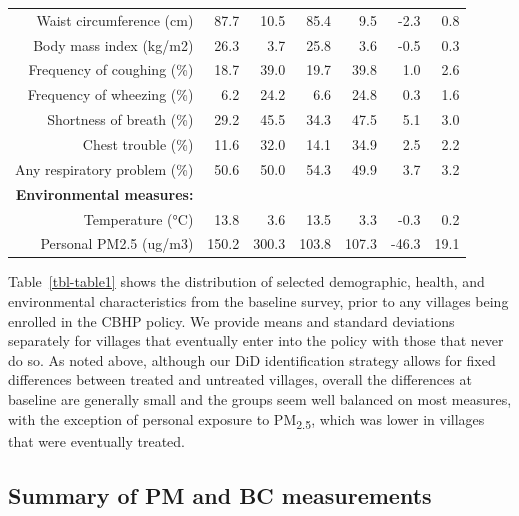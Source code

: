 \documentclass[
  letterpaper,
  DIV=11,
  numbers=noendperiod]{scrartcl}
\makeatletter
\renewenvironment{table}%
   {\renewcommand\familydefault\sfdefault
    \@float{table}}
   {\end@float}
\makeatother
\begin{document}
\begin{table}
\begin{tabular}[t]{rrrrrrr}
Waist circumference (cm) & 87.7 & 10.5 & 85.4 & 9.5 & -2.3 & 0.8\\
Body mass index (kg/m2) & 26.3 & 3.7 & 25.8 & 3.6 & -0.5 & 0.3\\
Frequency of coughing (\%) & 18.7 & 39.0 & 19.7 & 39.8 & 1.0 & 2.6\\
Frequency of wheezing (\%) & 6.2 & 24.2 & 6.6 & 24.8 & 0.3 & 1.6\\
Shortness of breath (\%) & 29.2 & 45.5 & 34.3 & 47.5 & 5.1 & 3.0\\
Chest trouble (\%) & 11.6 & 32.0 & 14.1 & 34.9 & 2.5 & 2.2\\
Any respiratory problem (\%) & 50.6 & 50.0 & 54.3 & 49.9 & 3.7 & 3.2\\
\textbf{Environmental measures:} & \textbf{} & \textbf{} & \textbf{} & \textbf{} & \textbf{} & \textbf{}\\
Temperature (°C) & 13.8 & 3.6 & 13.5 & 3.3 & -0.3 & 0.2\\
Personal PM2.5 (ug/m3) & 150.2 & 300.3 & 103.8 & 107.3 & -46.3 & 19.1\\
\bottomrule
\end{tabular}
\end{table}

Table~\ref{tbl-table1} shows the distribution of selected demographic,
health, and environmental characteristics from the baseline survey,
prior to any villages being enrolled in the CBHP policy. We provide
means and standard deviations separately for villages that eventually
enter into the policy with those that never do so. As noted above,
although our DiD identification strategy allows for fixed differences
between treated and untreated villages, overall the differences at
baseline are generally small and the groups seem well balanced on most
measures, with the exception of personal exposure to
PM\textsubscript{2.5}, which was lower in villages that were eventually
treated.

\hypertarget{summary-of-pm-and-bc-measurements}{%
\subsection{Summary of PM and BC
measurements}\label{summary-of-pm-and-bc-measurements}}
\end{document}
